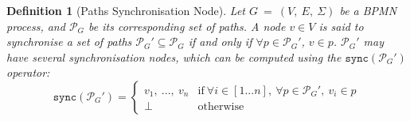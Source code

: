 \documentclass{article}
\newcommand*{\bpmnpargw}{\tikz[baseline=-.25em]{\node[shape=PF,draw,inner sep=0pt, minimum size=1.5em] (X) {};}}
\newcommand{\bpmnpargwmerge}{\ensuremath{\bpmnpargw_M}}
\newcommand{\closedarray}[2]{[#1...#2]}
\newcommand{\graph}{G~=~(V,~E,~\Sigma)}
\newcommand{\parentsof}[1]{\ensuremath{\mathtt{parents}(#1)}}
\newcommand{\paths}[1]{\mathcal{P}_{#1}}
\newcommand{\sync}[1]{\mathtt{sync}(#1)}
\newtheorem{definition}{Definition}
\begin{document}
	\begin{comment}
		Indeed, parallelism often comes with its share of problems, and this is also the case in this work.
		By switching an exclusive split gateway to a parallel split gateway, one may easily introduce \textit{deadlocks} or \textit{infinite recursion} in the model.
		A deadlock is a state in which a system (here, the process) can no longer progress due to the waiting of one or several of its parts for the termination of other parts that are themselves waiting for the first ones to terminate.
		In this approach, they may be generated by merge parallel gateways that do not (and will not) receive all the tokens that they need to be activated, thus preventing the children of these gateways from being triggered.
		
		\begin{definition}[Deadlock]
			Let $\graph$ be a graph representing a BPMN process, and let $v \in V$ be a parallel merge gateway \andgw$_M$.
			Following the definition of a parallel merge gateway (Definition~\ref{def:par_merge}), a deadlock occurs whenever $\exists v_p \in \parentsof{v}$ such that $v_p$ does not eventually acquire a token.
			Such a situation prevents \bpmnpargwmerge from being activated, and consequently the process to terminate.
		\end{definition}
		
		The second issue, namely the infinite recursion, is a phenomenon happening whenever a (sub-)process can recursively call itself infinitely.
		In BPMN, it happens when a parallel split gateway can be reached infinitely often by a token that it sent and which was not merged with its siblings beforehand.
		This is the case when a parallel split gateway can reach itself without reaching a node that \textit{synchronises} all its children paths beforehand.
	\end{comment}
	
	\begin{definition}[Paths Synchronisation Node]
		Let $\graph$ be a BPMN process, and $\paths{G}$ be its corresponding set of paths.
		A node $v \in V$ is said to \textnormal{synchronise a set of paths} $\paths{G}' \subseteq \paths{G}$ if and only if $\forall p \in \paths{G}'$, $v \in p$.
		$\paths{G}'$ may have several synchronisation nodes, which can be computed using the $\sync{\paths{G}'}$ operator:
		\begin{equation*}
			\sync{\paths{G}'} =
			\begin{cases}
				v_1,\ ...,\ v_n & \text{if} \ \forall i \in \closedarray{1}{n},\ \forall p \in \paths{G}', \ v_i \in p	\\
				\bot & \text{otherwise}
			\end{cases}
		\end{equation*}
	\end{definition}
	
\end{document}
